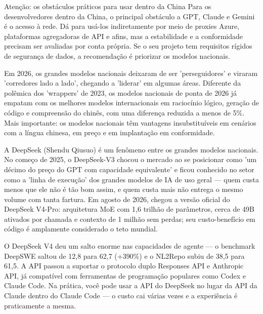 \begin{tcbwarn}{Atenção: os obstáculos práticos para usar dentro da China}
Para os desenvolvedores dentro da China, o principal obstáculo a GPT, Claude e Gemini é o acesso à rede. Dá para usá-los indiretamente por meio de proxies Azure, plataformas agregadoras de API e afins, mas a estabilidade e a conformidade precisam ser avaliadas por conta própria. Se o seu projeto tem requisitos rígidos de segurança de dados, a recomendação é priorizar os modelos nacionais.

\end{tcbwarn}


Em 2026, os grandes modelos nacionais deixaram de ser 'perseguidores' e viraram 'corredores lado a lado', chegando a 'liderar' em algumas áreas. Diferente da polêmica dos 'wrappers' de 2023, os modelos nacionais de ponta de 2026 já empatam com os melhores modelos internacionais em raciocínio lógico, geração de código e compreensão do chinês, com uma diferença reduzida a menos de 5\%. Mais importante: os modelos nacionais têm vantagens insubstituíveis em cenários com a língua chinesa, em preço e em implantação em conformidade.


A DeepSeek (Shendu Qiusuo) é um fenômeno entre os grandes modelos nacionais. No começo de 2025, o DeepSeek-V3 chocou o mercado ao se posicionar como 'um décimo do preço do GPT com capacidade equivalente' e ficou conhecido no setor como a 'linha de execução' dos grandes modelos de IA de uso geral — quem custa menos que ele não é tão bom assim, e quem custa mais não entrega o mesmo volume com tanta fartura. Em agosto de 2026, chegou a versão oficial do DeepSeek V4-Pro: arquitetura MoE com 1,6 trilhão de parâmetros, cerca de 49B ativados por chamada e contexto de 1 milhão sem perdas; seu custo-benefício em código é amplamente considerado o teto mundial.

O DeepSeek V4 deu um salto enorme nas capacidades de agente — o benchmark DeepSWE saltou de 12,8 para 62,7 (+390\%) e o NL2Repo subiu de 38,5 para 61,5. A API passou a suportar o protocolo duplo Responses API e Anthropic API, já compatível com ferramentas de programação populares como Codex e Claude Code. Na prática, você pode usar a API do DeepSeek no lugar da API da Claude dentro do Claude Code — o custo cai várias vezes e a experiência é praticamente a mesma.

